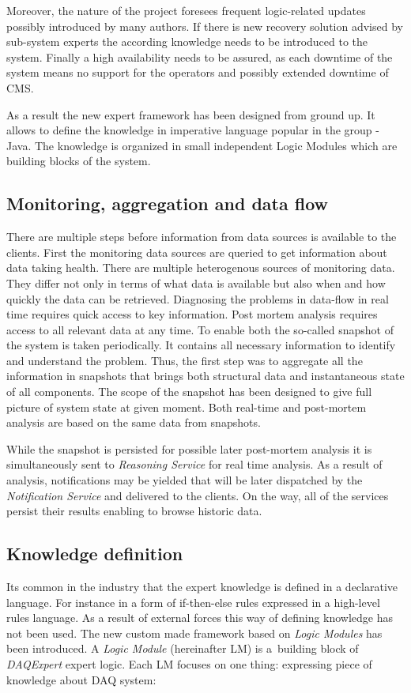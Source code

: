 \documentclass[a4paper]{jpconf}
\begin{document}
Moreover, the nature of the project foresees frequent logic-related updates possibly introduced by many authors. If there is new recovery solution advised by sub-system experts the according knowledge needs to be introduced to the system. Finally a high availability needs to be assured, as each downtime of the system means no support for the operators and possibly extended downtime of CMS. 

As a result the new expert framework has been designed from ground up. It allows to define the knowledge in imperative language popular in the group - Java. The knowledge is organized in small independent Logic Modules which are building blocks of the system.


\subsection{Monitoring, aggregation and data flow}

There are multiple steps before information from data sources is available to the clients. First the monitoring data sources are queried to get information about data taking health. There are multiple heterogenous sources of monitoring data. They differ not only in terms of what data is available but also when and how quickly the data can be retrieved. Diagnosing the problems in data-flow in real time requires quick access to key information. Post mortem analysis requires access to all relevant data at any time. To enable both the so-called snapshot of the system is taken periodically. It contains all necessary information to identify and understand the problem. Thus, the first step was to aggregate all the information in snapshots that brings both structural data and instantaneous state of all components. The scope of the snapshot has been designed to give full picture of system state at given moment. Both real-time and post-mortem analysis are based on the same data from snapshots.

While the snapshot is persisted for possible later post-mortem analysis it is simultaneously sent to {\it Reasoning Service} for real time analysis. As a result of analysis, notifications may be yielded that will be later dispatched by the {\it Notification Service} and delivered to the clients. On the way, all of the services persist their results enabling to browse historic data.


\subsection{Knowledge definition}
Its common in the industry that the expert knowledge is defined in a declarative language. For instance in a form of if-then-else rules expressed in a high-level rules language. As a result of external forces this way of defining knowledge has not been used. The new custom made framework based on {\it Logic Modules} has been introduced. A {\it Logic Module} (hereinafter LM) is a~building block of {\it DAQExpert} expert logic. Each LM focuses on one thing: expressing piece of knowledge about DAQ system:
\end{document}
